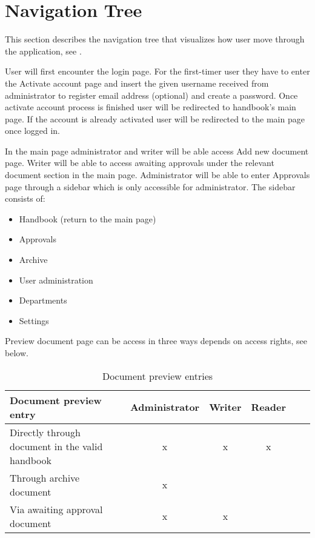 \section{Navigation Tree}
This section describes the navigation tree that visualizes how user move through the application, see . 


User will first encounter the login page.
For the first-timer user they have to enter the Activate account page and insert the given username received from administrator to register email address (optional) and create a password. 
Once activate account process is finished user will be redirected to handbook's main page.
If the account is already activated user will be redirected to the main page once logged in. 

In the main page administrator and writer will be able access Add new document page. 
Writer will be able to access awaiting approvals under the relevant document section in the main page.
Administrator will be able to enter Approvals page through a sidebar which is only accessible for administrator. 
The sidebar consists of:

\begin{itemize}
	\item Handbook (return to the main page)
	\item Approvals
	\item Archive
	\item User administration
	\item Departments
	\item Settings
\end{itemize}

Preview document page can be access in three ways depends on access rights, see  below.

\begin{table}[H]
	\begin{center}
	\begin{tabular}{| m{20em} | c | c | c | c | c |}
		\hline
		Document preview entry & Administrator & Writer & Reader \\
		\hline
		 Directly through document in the valid handbook & x  & x & x\\
		\hline
		 Through archive document  & x &  & \\
		\hline
		 Via awaiting approval document & x & x &  \\
		\hline
	\end{tabular}
	\end{center}
	\caption{Document preview entries}\label{tab:docPreviewEntries}
\end{table}

